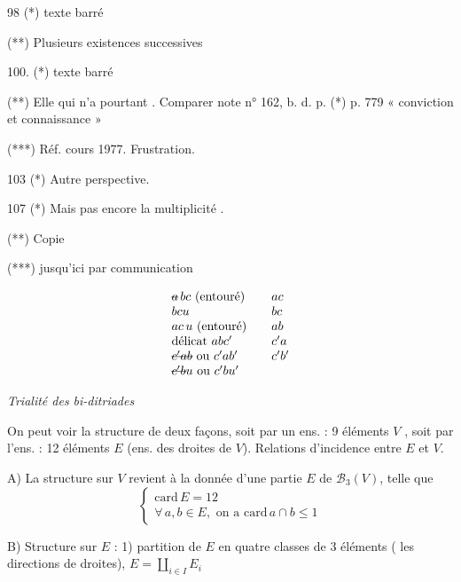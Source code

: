 \documentclass[11pt,a4paper]{article}
\begin{document}
98 (*) texte barré

 (**) Plusieurs existences successives

100. (*) texte barré

(**) Elle qui n'a pourtant \ill{}. Comparer note n° 162, b. d. p. (*) p. 779 « conviction et connaissance »

(***) Réf. cours 1977. Frustration.

103 (*) Autre perspective.

107 (*) Mais pas encore \ill{} la multiplicité \uncertain{\ill{}}.

(**) Copie

(***)  \ill{} \ill{} jusqu'ici par communication


\[
  \begin{array}{lcl}
    \text{\struck{$a$}}\,bc \ (\text{entouré}) & & ac \\
    bcu & & bc \\
    ac\,u \ (\text{entouré}) & & ab \\
    \text{délicat}\ abc' & & c'a \\
    \text{\struck{$c'ab$}} \text{ ou } c'ab' & & c'b' \\
    \text{\struck{$c'b$}}u \text{ ou } c'bu' & &
  \end{array}
\]

\emph{Trialité des bi-ditriades}

On peut voir la structure de deux façons, soit par un ens. : 9 éléments $V$ , soit par l'ens. : 12 éléments $E$ (ens. des droites de $V$). Relations d'incidence entre $E$ et $V$.


A) La structure sur $V$ revient à la donnée d'une partie $E$ de $\mathcal{B}_3(V)$, telle que
\[
  \begin{cases}
    \mathrm{card}\, E = 12 \\
    \forall\, a, b \in E, \text{ on a } \mathrm{card}\, a \cap b \leqslant 1
  \end{cases}
\]

 B) Structure sur $E$ : 1) partition de $E$ en quatre classes de 3 éléments ( les  directions de droites), $E = \coprod_{i \in I} E_i$
\end{document}
